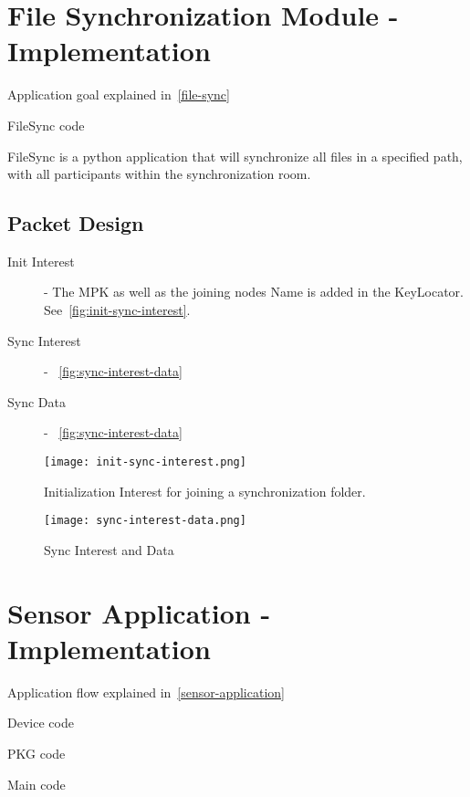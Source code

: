 \section{File Synchronization Module - Implementation}
Application goal explained in~\autoref{file-sync}

FileSync code~\cite[fileSync.py]{garseg15}

FileSync is a python application that will synchronize all files in a specified path, with all participants within the synchronization room.

\subsection{Packet Design}

\begin{description}
  \item[Init Interest] - 
  The \gls{MPK} as well as the joining nodes Name is added in the KeyLocator. See~\autoref{fig:init-sync-interest}.
  \item[Sync Interest] -
  ~\autoref{fig:sync-interest-data}
  \item[Sync Data] - 
  ~\autoref{fig:sync-interest-data}
\end{description}

\begin{figure}[ht]
  \centering
  \texttt{[image: init-sync-interest.png]}
  \caption{Initialization Interest for joining a synchronization folder.}
  \label{fig:init-sync-interest}
\end{figure}

\begin{figure}[ht]
  \centering
  \texttt{[image: sync-interest-data.png]}
  \caption{Sync Interest and Data}
  \label{fig:sync-interest-data}
\end{figure}


\section{Sensor Application - Implementation}
Application flow explained in~\autoref{sensor-application}

Device code~\cite[device.py]{garseg15}

\gls{PKG} code~\cite[publicKeyGenerator.py]{garseg15}

Main code~\cite[application.py]{garseg15}


